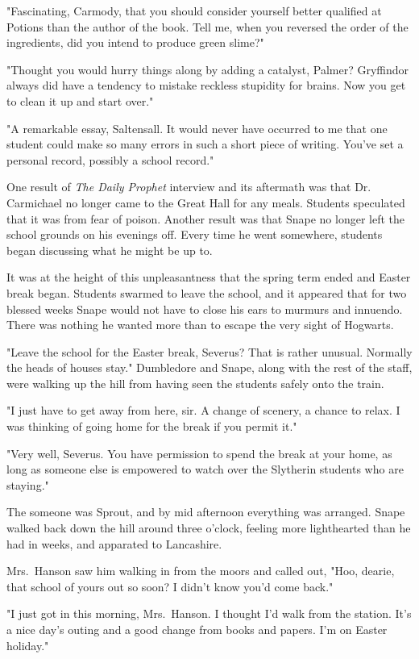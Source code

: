 "Fascinating, Carmody, that you should consider yourself better qualified at Potions than the author of the book. Tell me, when you reversed the order of the ingredients, did you intend to produce green slime?"

"Thought you would hurry things along by adding a catalyst, Palmer? Gryffindor always did have a tendency to mistake reckless stupidity for brains. Now you get to clean it up and start over."

"A remarkable essay, Saltensall. It would never have occurred to me that one student could make so many errors in such a short piece of writing. You've set a personal record, possibly a school record."

One result of \emph{The Daily Prophet} interview and its aftermath was that Dr. Carmichael no longer came to the Great Hall for any meals. Students speculated that it was from fear of poison. Another result was that Snape no longer left the school grounds on his evenings off. Every time he went somewhere, students began discussing what he might be up to.

It was at the height of this unpleasantness that the spring term ended and Easter break began. Students swarmed to leave the school, and it appeared that for two blessed weeks Snape would not have to close his ears to murmurs and innuendo. There was nothing he wanted more than to escape the very sight of Hogwarts.

"Leave the school for the Easter break, Severus? That is rather unusual. Normally the heads of houses stay." Dumbledore and Snape, along with the rest of the staff, were walking up the hill from having seen the students safely onto the train.

"I just have to get away from here, sir. A change of scenery, a chance to relax. I was thinking of going home for the break if you permit it."

"Very well, Severus. You have permission to spend the break at your home, as long as someone else is empowered to watch over the Slytherin students who are staying."

The someone was Sprout, and by mid afternoon everything was arranged. Snape walked back down the hill around three o'clock, feeling more lighthearted than he had in weeks, and apparated to Lancashire.

Mrs.~Hanson saw him walking in from the moors and called out, "Hoo, dearie, that school of yours out so soon? I didn't know you'd come back."

"I just got in this morning, Mrs.~Hanson. I thought I'd walk from the station. It's a nice day's outing and a good change from books and papers. I'm on Easter holiday."

